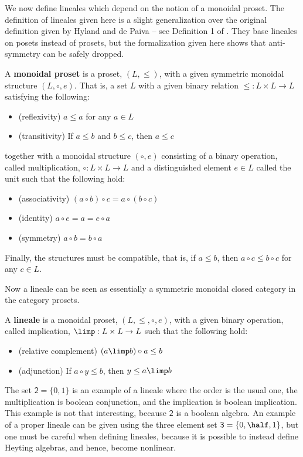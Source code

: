 We now define lineales which depend on the notion of a monoidal
proset.  The definition of lineales given here is a slight
generalization over the original definition given by Hyland and de
Paiva -- see Definition 1 of \cite{Hyland:1991}.  They base lineales
on posets instead of prosets, but the formalization given here shows
that anti-symmetry can be safely dropped.
\begin{definition}
  \label{def:monoidal-proset}
  A \textbf{monoidal proset} is a proset, $(L, \leq)$, with a given
  symmetric monoidal structure $(L, \circ, e)$.  That is, a set $L$
  with a given binary relation $\leq : L \times L \to L$ satisfying
  the following:
  \begin{itemize}
  \item (reflexivity) $a \leq a$ for any $a \in L$
  \item (transitivity) If $a \leq b$ and $b \leq c$, then $a \leq c$
  \end{itemize}
  together with a monoidal structure $(\circ, e)$ consisting of a
  binary operation, called multiplication, $\circ : L \times L \to L$
  and a distinguished element $e \in L$ called the unit such that the
  following hold:
  \begin{itemize}
  \item (associativity) $(a \circ b) \circ c = a \circ (b \circ c)$
  \item (identity) $a \circ e = a = e \circ a$
  \item (symmetry) $a \circ b = b \circ a$
  \end{itemize}
  Finally, the structures must be compatible, that is, if $a \leq b$,
  then $a \circ c \leq b \circ c$ for any $c \in L$.
\end{definition}
Now a lineale can be seen as essentially a symmetric monoidal closed
category in the category prosets.
\begin{definition}
  \label{def:lineale}
  A \textbf{lineale} is a monoidal proset, $(L, \leq, \circ, e)$, with
  a given binary operation, called implication, $\limp : L \times L
  \to L$ such that the following hold:
  \begin{itemize}
  \item (relative complement) $(a \limp b) \circ a \leq b$ 
  \item (adjunction) If $a \circ y \leq b$, then $y \leq a \limp b$
  \end{itemize}
\end{definition}
The set $\mathsf{2} = \{0,1\}$ is an example of a lineale where the
order is the usual one, the multiplication is boolean conjunction, and
the implication is boolean implication.  This example is not that
interesting, because $\mathsf{2}$ is a boolean algebra.  An example of
a proper lineale can be given using the three element set
$\mathsf{3} = \{0,\half, 1\}$, but one must be careful when
defining lineales, because it is possible to instead define Heyting
algebras, and hence, become nonlinear.

